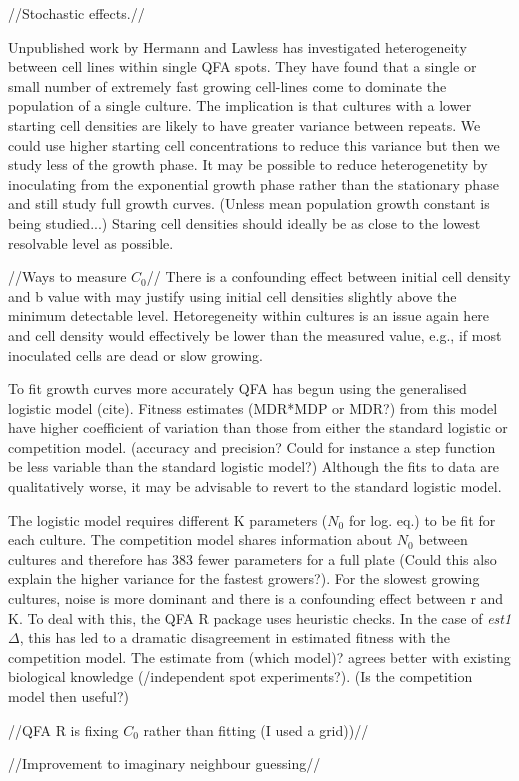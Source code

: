 //Stochastic effects.//

Unpublished work by Hermann and Lawless has investigated heterogeneity
between cell lines within single QFA spots. They have found that a
single or small number of extremely fast growing cell-lines come to
dominate the population of a single culture. The implication is that
cultures with a lower starting cell densities are likely to have
greater variance between repeats. We could use higher starting cell
concentrations to reduce this variance but then we study less of the
growth phase. It may be possible to reduce heterogenetity by inoculating
from the exponential growth phase rather than the stationary phase and
still study full growth curves. (Unless mean population growth
constant is being studied...) Staring cell densities should ideally be
as close to the lowest resolvable level as possible.

//Ways to measure \(C_{0}\)// There is a confounding effect between
initial cell density and b value with may justify using initial cell
densities slightly above the minimum detectable level. Hetoregeneity
within cultures is an issue again here and cell density would
effectively be lower than the measured value, e.g., if most inoculated
cells are dead or slow growing.

To fit growth curves more accurately QFA has begun using the
generalised logistic model (cite). Fitness estimates (MDR*MDP or MDR?)
from this model have higher coefficient of variation than those from
either the standard logistic or competition model. (accuracy and
precision? Could for instance a step function be less variable than
the standard logistic model?)  Although the fits to data are
qualitatively worse, it may be advisable to revert to the standard
logistic model.


The logistic model requires different K parameters (\(N_{0}\) for
log. eq.) to be fit for each culture. The competition model shares
information about \(N_{0}\) between cultures and therefore has 383
fewer parameters for a full plate (Could this also explain the higher
variance for the fastest growers?). For the slowest growing cultures,
noise is more dominant and there is a confounding effect between r and
K. To deal with this, the QFA R package uses heuristic checks. In the
case of \textit{est1\(\Delta\)}, this has led to a dramatic
disagreement in estimated fitness with the competition model. The
estimate from (which model)? agrees better with existing biological
knowledge (/independent spot experiments?). (Is the competition model
then useful?)

//QFA R is fixing \(C_{0}\) rather than fitting (I used a grid))//

//Improvement to imaginary neighbour guessing//


